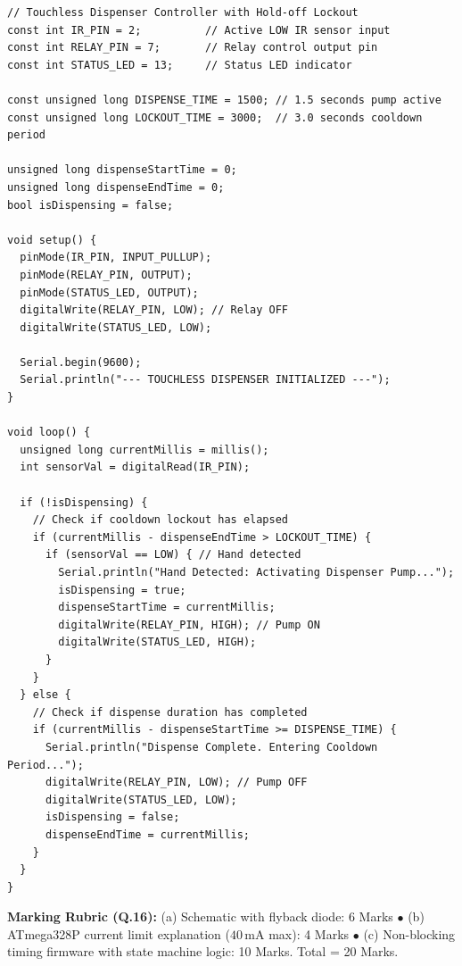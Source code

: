 \begin{solutionbox}
\begin{verbatim}
// Touchless Dispenser Controller with Hold-off Lockout
const int IR_PIN = 2;          // Active LOW IR sensor input
const int RELAY_PIN = 7;       // Relay control output pin
const int STATUS_LED = 13;     // Status LED indicator

const unsigned long DISPENSE_TIME = 1500; // 1.5 seconds pump active
const unsigned long LOCKOUT_TIME = 3000;  // 3.0 seconds cooldown period

unsigned long dispenseStartTime = 0;
unsigned long dispenseEndTime = 0;
bool isDispensing = false;

void setup() {
  pinMode(IR_PIN, INPUT_PULLUP);
  pinMode(RELAY_PIN, OUTPUT);
  pinMode(STATUS_LED, OUTPUT);
  digitalWrite(RELAY_PIN, LOW); // Relay OFF
  digitalWrite(STATUS_LED, LOW);
  
  Serial.begin(9600);
  Serial.println("--- TOUCHLESS DISPENSER INITIALIZED ---");
}

void loop() {
  unsigned long currentMillis = millis();
  int sensorVal = digitalRead(IR_PIN);
  
  if (!isDispensing) {
    // Check if cooldown lockout has elapsed
    if (currentMillis - dispenseEndTime > LOCKOUT_TIME) {
      if (sensorVal == LOW) { // Hand detected
        Serial.println("Hand Detected: Activating Dispenser Pump...");
        isDispensing = true;
        dispenseStartTime = currentMillis;
        digitalWrite(RELAY_PIN, HIGH); // Pump ON
        digitalWrite(STATUS_LED, HIGH);
      }
    }
  } else {
    // Check if dispense duration has completed
    if (currentMillis - dispenseStartTime >= DISPENSE_TIME) {
      Serial.println("Dispense Complete. Entering Cooldown Period...");
      digitalWrite(RELAY_PIN, LOW); // Pump OFF
      digitalWrite(STATUS_LED, LOW);
      isDispensing = false;
      dispenseEndTime = currentMillis;
    }
  }
}
\end{verbatim}
\end{solutionbox}
\begin{markingrubric}
\textbf{Marking Rubric (Q.16):} (a) Schematic with flyback diode: 6 Marks $\bullet$ (b) ATmega328P current limit explanation ($40\,\mathrm{mA}$ max): 4 Marks $\bullet$ (c) Non-blocking timing firmware with state machine logic: 10 Marks. Total = 20 Marks.
\end{markingrubric}
\newpage
